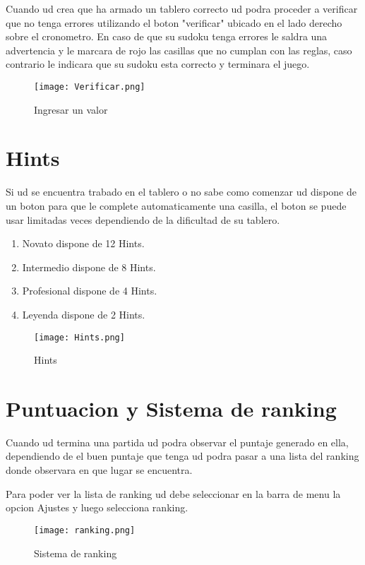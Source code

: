\documentclass[11pt,fleqn]{book} %
\begin{document}
Cuando ud crea que ha armado un tablero correcto ud podra proceder a verificar que no tenga errores utilizando el boton "verificar" ubicado en el lado derecho sobre el cronometro.
En caso de que su sudoku tenga errores le saldra una advertencia y le marcara de rojo las casillas que no cumplan con las reglas, caso contrario le indicara que su sudoku esta correcto y terminara el juego.

\begin{figure}[H]
\centering\texttt{[image: Verificar.png]}
\caption{Ingresar un valor}
\end{figure}

\section{Hints}

Si ud se encuentra trabado en el tablero o no sabe como comenzar ud dispone de un boton para que le complete automaticamente una casilla, el boton se puede usar limitadas veces dependiendo de la dificultad de su tablero.

\begin{enumerate}
\item Novato dispone de 12 Hints.
\item Intermedio dispone de 8 Hints.
\item Profesional dispone de 4 Hints.
\item Leyenda dispone de 2 Hints.
\end{enumerate}

\begin{figure}[H]
\centering\texttt{[image: Hints.png]}
\caption{Hints}
\end{figure}

\section{Puntuacion y Sistema de ranking}

Cuando ud termina una partida ud podra observar el puntaje generado en ella, dependiendo de el buen puntaje que tenga ud podra pasar a una lista del ranking donde observara en que lugar se encuentra.

Para poder ver la lista de ranking ud debe seleccionar en la barra de menu la opcion Ajustes y luego selecciona ranking.

\begin{figure}[H]
\centering\texttt{[image: ranking.png]}
\caption{Sistema de ranking}
\end{figure}
\end{document}
